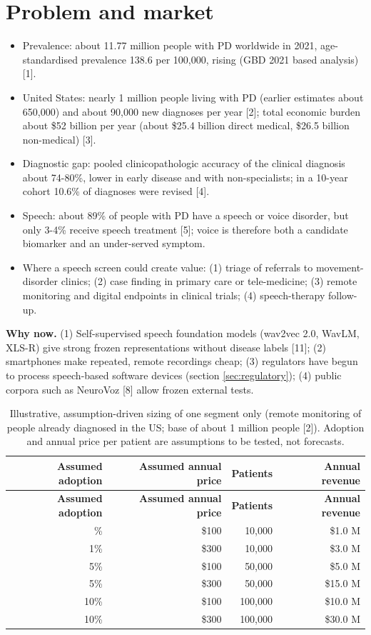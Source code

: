 \documentclass[10pt,a4paper]{article}
\begin{document}
\section{Problem and market}\label{sec:market}
\begin{itemize}\item Prevalence: about 11.77 million people with PD worldwide in 2021, age-standardised prevalence 138.6 per 100,000, rising (GBD 2021 based analysis) [1].
\item United States: nearly 1 million people living with PD (earlier estimates about 650,000) and about 90,000 new diagnoses per year [2]; total economic burden about \$52 billion per year (about \$25.4 billion direct medical, \$26.5 billion non-medical) [3].
\item Diagnostic gap: pooled clinicopathologic accuracy of the clinical diagnosis about 74-80\%, lower in early disease and with non-specialists; in a 10-year cohort 10.6\% of diagnoses were revised [4].
\item Speech: about 89\% of people with PD have a speech or voice disorder, but only 3-4\% receive speech treatment [5]; voice is therefore both a candidate biomarker and an under-served symptom.
\item Where a speech screen could create value: (1) triage of referrals to movement-disorder clinics; (2) case finding in primary care or tele-medicine; (3) remote monitoring and digital endpoints in clinical trials; (4) speech-therapy follow-up.
\end{itemize}
\textbf{Why now.} (1) Self-supervised speech foundation models (wav2vec 2.0, WavLM, XLS-R) give strong frozen representations without disease labels [11]; (2) smartphones make repeated, remote recordings cheap; (3) regulators have begun to process speech-based software devices (section \ref{sec:regulatory}); (4) public corpora such as NeuroVoz [8] allow frozen external tests.
\begin{center}\scriptsize\renewcommand{\arraystretch}{1.12}
\begin{longtable}{rrrr}
\caption{Illustrative, assumption-driven sizing of one segment only (remote monitoring of people already diagnosed in the US; base of about 1 million people [2]). Adoption and annual price per patient are assumptions to be tested, not forecasts.}\\
\toprule
\textbf{Assumed adoption} & \textbf{Assumed annual price} & \textbf{Patients} & \textbf{Annual revenue}\\\midrule\endfirsthead
\toprule
\textbf{Assumed adoption} & \textbf{Assumed annual price} & \textbf{Patients} & \textbf{Annual revenue}\\\midrule\endhead
\bottomrule\endfoot
1\% & \$100 & 10,000 & \$1.0 M\\
1\% & \$300 & 10,000 & \$3.0 M\\
5\% & \$100 & 50,000 & \$5.0 M\\
5\% & \$300 & 50,000 & \$15.0 M\\
10\% & \$100 & 100,000 & \$10.0 M\\
10\% & \$300 & 100,000 & \$30.0 M\\
\end{longtable}\end{center}
\end{document}

